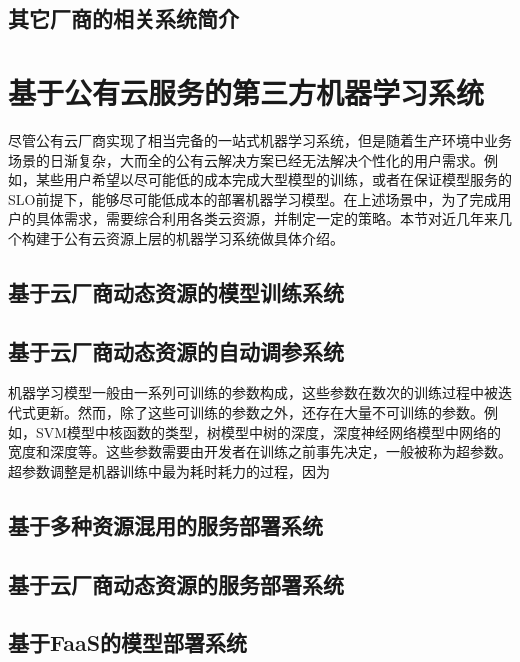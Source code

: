 \subsection{其它厂商的相关系统简介}

\section{基于公有云服务的第三方机器学习系统}
尽管公有云厂商实现了相当完备的一站式机器学习系统，但是随着生产环境中业务场景的日渐复杂，大而全的公有云解决方案已经无法解决个性化的用户需求。例如，某些用户希望以尽可能低的成本完成大型模型的训练，或者在保证模型服务的SLO前提下，能够尽可能低成本的部署机器学习模型。在上述场景中，为了完成用户的具体需求，需要综合利用各类云资源，并制定一定的策略。本节对近几年来几个构建于公有云资源上层的机器学习系统做具体介绍。
\subsection{基于云厂商动态资源的模型训练系统}

\subsection{基于云厂商动态资源的自动调参系统}
机器学习模型一般由一系列可训练的参数构成，这些参数在数次的训练过程中被迭代式更新。然而，除了这些可训练的参数之外，还存在大量不可训练的参数。例如，SVM模型中核函数的类型，树模型中树的深度，深度神经网络模型中网络的宽度和深度等。这些参数需要由开发者在训练之前事先决定，一般被称为超参数。超参数调整是机器训练中最为耗时耗力的过程，因为

\subsection{基于多种资源混用的服务部署系统}

\subsection{基于云厂商动态资源的服务部署系统}

\subsection{基于FaaS的模型部署系统}


